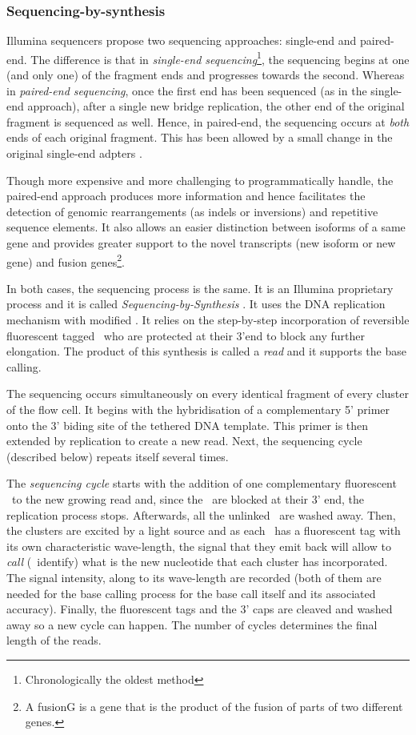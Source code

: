 \subsubsection{Sequencing-by-synthesis}
\label{subsub:sequencing}

Illumina sequencers propose two sequencing approaches: single-end and paired-end.
The difference is that in \emph{single-end sequencing}\footnote{Chronologically
the oldest method}, the sequencing begins at one (and only one) of the fragment
ends and progresses towards the second. Whereas in \emph{paired-end sequencing},
once the first end has been sequenced (as in the single-end approach), after a
single new bridge replication, the other end of the original fragment is
sequenced as well. Hence, in paired-end, the sequencing occurs at \emph{both}
ends of each original fragment. This has been allowed by a small change in
the original single-end adpters .

Though more expensive and more challenging to programmatically handle,
the paired-end approach produces more information and hence facilitates
the detection of genomic rearrangements (as indels or inversions) and
repetitive sequence elements.
It also allows an easier distinction between isoforms of a same gene and provides
greater support to the novel transcripts (new isoform or new gene) and fusion
genes\footnote{A \gls{fusionG} is a gene that is the product of the fusion of
parts of two different genes.}.

In both cases, the sequencing process is the same. It is an Illumina proprietary
process and it is called \emph{Sequencing-by-Synthesis} .
It uses the \gls{DNA} replication mechanism with modified \dNTPs.
It relies on the step-by-step incorporation of
reversible fluorescent tagged \dNTPs\ who are protected at
their 3'end to block any further elongation.
The product of this synthesis is called a \emph{read} and it supports the base
calling.

The sequencing occurs simultaneously on every identical fragment
of every cluster of the flow cell.
It begins with the hybridisation of a complementary 5' primer onto the 3' biding
site of the tethered \gls{DNA} template. This primer is then extended by
replication to create a new read. Next, the sequencing cycle (described below)
repeats itself several times.

The \emph{sequencing cycle} starts with the addition of one complementary
fluorescent \dNTP\ to the new growing read and, since the \dNTPs\ are blocked at
their 3' end, the replication process stops. Afterwards, all the unlinked
\dNTPs\ are washed away. Then, the clusters are excited by a light source
and as each
\dNTPs\ has a fluorescent tag with its own characteristic wave-length, the
signal that they emit back will allow to \emph{call} (\ie\ identify) what is the
new nucleotide that each cluster has incorporated. The signal intensity, along to
its wave-length are recorded (both of them are needed for the base calling
process for the base call itself and its associated accuracy). Finally,
the fluorescent tags and the 3' caps are cleaved
and washed away so a new cycle can happen.
The number of cycles determines the final length of the reads.

